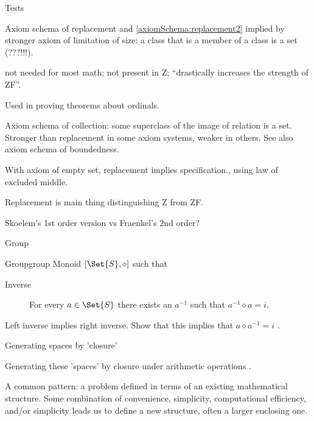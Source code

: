 \documentclass{PalisadesLakesBook}
\begin{document}
\begin{plSection}{Tests}
\begin{plSection}{Axiom schema of replacement}
and \cref{axiomSchema:replacement2} implied by stronger
axiom of limitation of 
size\cite{wiki:AxiomOfLimitationOfSize}:
a class that is a member of a class is a set (???!!!).

 not needed for most math;
not present in \textsf{Z};
``drastically increases the strength of \textsf{ZF}''.

Used in proving theorems about ordinals.

Axiom schema of collection: some superclass of 
the image of relation is a set.
Stronger than replacement
in some axiom systems, weaker in others.
See also axiom schema of boundedness.

With axiom of empty set, replacement implies specification.,
using law of excluded middle.

Replacement is main thing distinguishing \textsf{Z}
from \textsf{ZF}.

Skoelem's 1st order version vs Fraenkel's $2$nd order?

\end{plSection}%
\begin{plSection}{Group}

\begin{plDefinition}{Group}{group}
Monoid $\left[ \Set{S}, \diamond \right]$ such that
\begin{description}
 \item[Inverse] For every $a \in \Set{S}$ there exists an
 $a^{-1}$ such that $a^{-1} \diamond a = i$.
\end{description}
\end{plDefinition}

\begin{plExercise}{}{Left inverse implies right inverse.}
Show that this implies that $a \diamond a^{-1} = i$ .
\end{plExercise} 

\end{plSection}%
\begin{plSection}{Generating spaces by 'closure'}

Generating these 'spaces' by closure under arithmetic operations
\cite{PickertGorke:1974:RealNumbers}.

A common pattern: 
a problem defined in terms of an existing mathematical
structure. 
Some combination of convenience, simplicity, computational
efficiency, and/or simplicity leads us to define a new structure, 
often a larger enclosing one.


\end{plSection}
\end{plSection}
\end{document}
